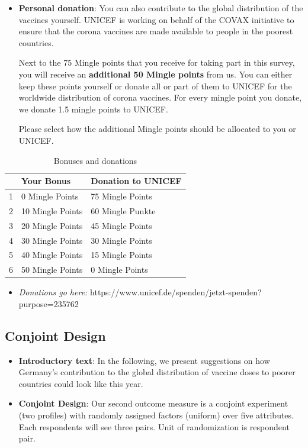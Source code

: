 \documentclass[12pt,oneside,smallheadings,chapterprefix=true]{article}
\begin{document}
\begin{itemize}
\item
  \textbf{Personal donation}: You can also contribute to the global
  distribution of the vaccines yourself. UNICEF is working on behalf of
  the COVAX initiative to ensure that the corona vaccines are made
  available to people in the poorest countries.

  Next to the 75 Mingle points that you receive for taking part in this
  survey, you will receive an \textbf{additional 50 Mingle points} from
  us. You can either keep these points yourself or donate all or part of
  them to UNICEF for the worldwide distribution of corona vaccines. For
  every mingle point you donate, we donate 1.5 mingle points to UNICEF.

  Please select how the additional Mingle points should be allocated to
  you or UNICEF.
\end{itemize}




\begin{longtable}[]{@{}lll@{}}
\caption{Bonuses and donations}
\label{table:mingle}
\endfirsthead
\endhead
\toprule
& Your Bonus & Donation to UNICEF\tabularnewline
\midrule
\endhead
1 & 0 Mingle Points & 75 Mingle Points\tabularnewline
2 & 10 Mingle Points & 60 Mingle Punkte\tabularnewline
3 & 20 Mingle Points & 45 Mingle Points\tabularnewline
4 & 30 Mingle Points & 30 Mingle Points\tabularnewline
5 & 40 Mingle Points & 15 Mingle Points\tabularnewline
6 & 50 Mingle Points & 0 Mingle Points\tabularnewline
\bottomrule
\end{longtable}


\begin{itemize}
\tightlist
\item
  \emph{Donations go here:}
  https://www.unicef.de/spenden/jetzt-spenden?purpose=235762
\end{itemize}

    \hypertarget{conjoint-design}{%
\subsection{Conjoint Design}\label{conjoint-design}}

\begin{itemize}
\tightlist
\item
  \textbf{Introductory text}: In the following, we present suggestions
  on how Germany's contribution to the global distribution of vaccine
  doses to poorer countries could look like this year.
\item
  \textbf{Conjoint Design}: Our second outcome measure is a conjoint experiment (two profiles) with randomly assigned factors (uniform) over five attributes. Each respondents will see three pairs. Unit of randomization is respondent pair.
\end{itemize}
\end{document}
